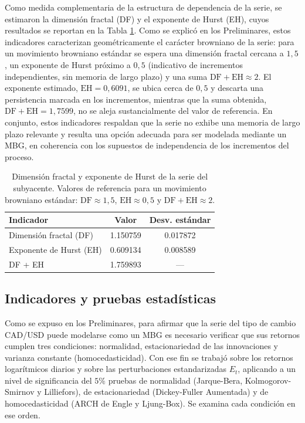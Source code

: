 \documentclass{article}
\begin{document}
Como medida complementaria de la estructura de dependencia de la serie, se estimaron la dimensión fractal (DF) y el exponente de Hurst (EH), cuyos resultados se reportan en la Tabla \ref{tab:fractal_hurst}. Como se explicó en los Preliminares, estos indicadores caracterizan geométricamente el carácter browniano de la serie: para un movimiento browniano estándar se espera una dimensión fractal cercana a $1{,}5$, un exponente de Hurst próximo a $0{,}5$ (indicativo de incrementos independientes, sin memoria de largo plazo) y una suma $\text{DF}+\text{EH}\approx 2$. El exponente estimado, $\text{EH}=0{,}6091$, se ubica cerca de $0{,}5$ y descarta una persistencia marcada en los incrementos, mientras que la suma obtenida, $\text{DF}+\text{EH}=1{,}7599$, no se aleja sustancialmente del valor de referencia. En conjunto, estos indicadores respaldan que la serie no exhibe una memoria de largo plazo relevante y resulta una opción adecuada para ser modelada mediante un MBG, en coherencia con los supuestos de independencia de los incrementos del proceso.

\begin{table}[H]
\centering
\begin{tabular}{lcc}
\hline
Indicador & Valor & Desv. estándar \\
\hline
Dimensión fractal (DF)   & 1.150759 & 0.017872 \\
Exponente de Hurst (EH)  & 0.609134 & 0.008589 \\
DF + EH                  & 1.759893 & — \\
\hline
\end{tabular}
\caption{Dimensión fractal y exponente de Hurst de la serie del subyacente. Valores de referencia para un movimiento browniano estándar: $\text{DF}\approx 1{,}5$, $\text{EH}\approx 0{,}5$ y $\text{DF}+\text{EH}\approx 2$.}
\label{tab:fractal_hurst}
\end{table}

\subsection*{Indicadores y pruebas estadísticas}
Como se expuso en los Preliminares, para afirmar que la serie del tipo de cambio CAD/USD puede modelarse como un MBG es necesario verificar que sus retornos cumplen tres condiciones: normalidad, estacionariedad de las innovaciones y varianza constante (homocedasticidad). Con ese fin se trabajó sobre los retornos logarítmicos diarios y sobre las perturbaciones estandarizadas $E_t$, aplicando a un nivel de significancia del $5\%$ pruebas de normalidad (Jarque-Bera, Kolmogorov-Smirnov y Lilliefors), de estacionariedad (Dickey-Fuller Aumentada) y de homocedasticidad (ARCH de Engle y Ljung-Box). Se examina cada condición en ese orden.
\end{document}
